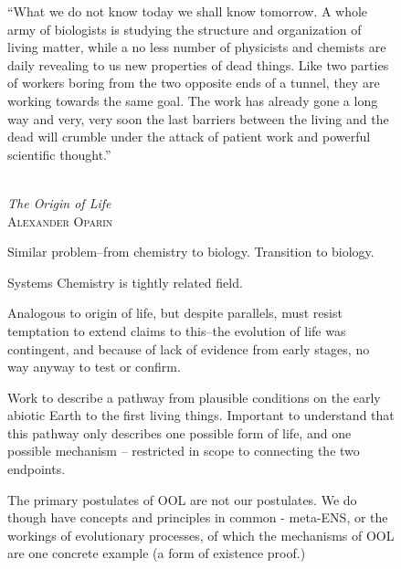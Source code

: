 \begin{figure}
\begin{framed}

\epigraph{%
``What we do not know today we shall know tomorrow. A whole army of biologists is studying the structure and organization of
living matter, while a no less number of physicists and chemists are daily revealing to us new properties of dead things. Like two parties
of workers boring from the two opposite ends of a tunnel, they are working towards the same goal. The work has already gone a long way
and very, very soon the last barriers between the living and the dead will crumble under the attack of patient work and powerful scientific
thought.''}%
{\textit{\\The Origin of Life}\\\textsc{Alexander Oparin}}

Similar problem--from chemistry to biology. Transition to biology.

Systems Chemistry is tightly related field.

Analogous to origin of life, but despite parallels, must resist temptation to extend claims to this--the evolution of life was contingent, and because of lack of evidence from early stages, no way anyway to test or confirm.

Work to describe a pathway from plausible conditions on the early abiotic Earth to the first living things. Important to understand that this pathway only describes one possible form of life, and one possible mechanism -- restricted in scope to connecting the two endpoints.

The primary postulates of OOL are not our postulates. We do though have concepts and principles in common - meta-ENS, or the workings of evolutionary processes, of which the mechanisms of OOL are one concrete example (a form of existence proof.)


\end{framed}
\end{figure}
